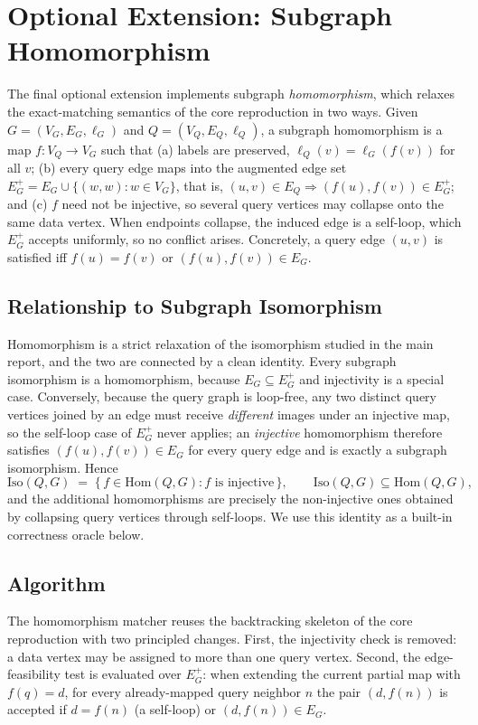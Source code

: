 \section{Optional Extension: Subgraph Homomorphism}
\label{sec:optional-homomorphism}

The final optional extension implements subgraph \emph{homomorphism}, which relaxes the exact-matching semantics of the core reproduction in two ways. Given $G = (V_G, E_G, \ell_G)$ and $Q = (V_Q, E_Q, \ell_Q)$, a subgraph homomorphism is a map $f : V_Q \rightarrow V_G$ such that (a) labels are preserved, $\ell_Q(v) = \ell_G(f(v))$ for all $v$; (b) every query edge maps into the augmented edge set $E_G^+ = E_G \cup \{(w, w) : w \in V_G\}$, that is, $(u, v) \in E_Q \Rightarrow (f(u), f(v)) \in E_G^+$; and (c) $f$ need not be injective, so several query vertices may collapse onto the same data vertex. When endpoints collapse, the induced edge is a self-loop, which $E_G^+$ accepts uniformly, so no conflict arises. Concretely, a query edge $(u, v)$ is satisfied iff $f(u) = f(v)$ or $(f(u), f(v)) \in E_G$.

\subsection{Relationship to Subgraph Isomorphism}

Homomorphism is a strict relaxation of the isomorphism studied in the main report, and the two are connected by a clean identity. Every subgraph isomorphism is a homomorphism, because $E_G \subseteq E_G^+$ and injectivity is a special case. Conversely, because the query graph is loop-free, any two distinct query vertices joined by an edge must receive \emph{different} images under an injective map, so the self-loop case of $E_G^+$ never applies; an \emph{injective} homomorphism therefore satisfies $(f(u), f(v)) \in E_G$ for every query edge and is exactly a subgraph isomorphism. Hence
\[
\mathrm{Iso}(Q, G) \;=\; \{\, f \in \mathrm{Hom}(Q, G) : f \text{ is injective} \,\}, \qquad \mathrm{Iso}(Q, G) \subseteq \mathrm{Hom}(Q, G),
\]
and the additional homomorphisms are precisely the non-injective ones obtained by collapsing query vertices through self-loops. We use this identity as a built-in correctness oracle below.

\subsection{Algorithm}

The homomorphism matcher reuses the backtracking skeleton of the core reproduction with two principled changes. First, the injectivity check is removed: a data vertex may be assigned to more than one query vertex. Second, the edge-feasibility test is evaluated over $E_G^+$: when extending the current partial map with $f(q) = d$, for every already-mapped query neighbor $n$ the pair $(d, f(n))$ is accepted if $d = f(n)$ (a self-loop) or $(d, f(n)) \in E_G$.

